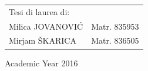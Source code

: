 \begin{titlepage}
\begin{flushright}
\begin{tabular}{ll}
Tesi di laurea di: & \tabularnewline
Milica JOVANOVI\'{C} & Matr. 835953\tabularnewline
Mirjam \v{S}KARICA & Matr. 836505\tabularnewline
\end{tabular}\vspace{2.2cm}

\par\end{flushright}

\begin{center}
{\large{}Academic Year 2016}
\par\end{center}{\large \par}

\end{titlepage}
